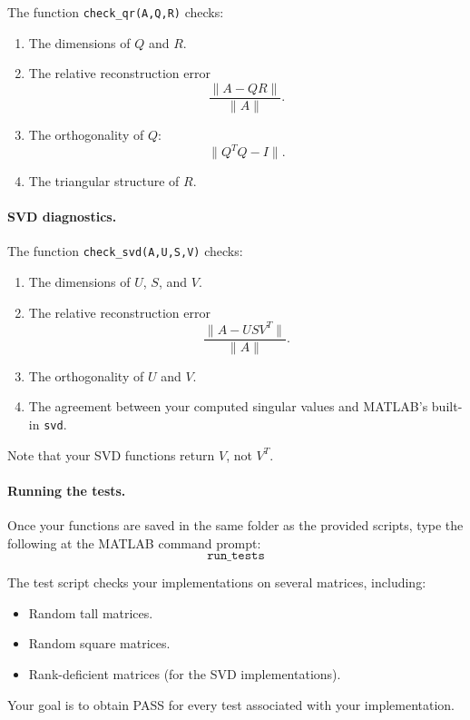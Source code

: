 \documentclass{ximera}
\begin{document}
The function \texttt{check\_qr(A,Q,R)} checks:

\begin{enumerate}
    \item The dimensions of $Q$ and $R$.
    \item The relative reconstruction error
    \[
    \frac{\|A-QR\|}{\|A\|}.
    \]
    \item The orthogonality of $Q$:
    \[
    \|Q^TQ-I\|.
    \]
    \item The triangular structure of $R$.
\end{enumerate}

\paragraph{SVD diagnostics.}

The function \texttt{check\_svd(A,U,S,V)} checks:

\begin{enumerate}
    \item The dimensions of $U$, $S$, and $V$.
    \item The relative reconstruction error
    \[
    \frac{\|A-USV^T\|}{\|A\|}.
    \]
    \item The orthogonality of $U$ and $V$.
    \item The agreement between your computed singular values and
    MATLAB's built-in \texttt{svd}.
\end{enumerate}

Note that your SVD functions return $V$, not $V^T$.

\paragraph{Running the tests.}

Once your functions are saved in the same folder as the provided
scripts, type the following at the MATLAB command prompt:
\[
\texttt{run\_tests}
\]

The test script checks your implementations on several matrices,
including:

\begin{itemize}
    \item Random tall matrices.
    \item Random square matrices.
    \item Rank-deficient matrices (for the SVD implementations).
\end{itemize}

Your goal is to obtain PASS for every test associated with your
implementation.
\end{document}
